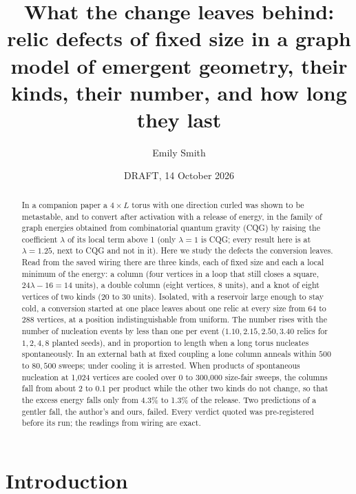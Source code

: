 \documentclass[aps,pre,10pt,twocolumn,superscriptaddress,nofootinbib]{revtex4-2}
\begin{document}
\title{What the change leaves behind: relic defects of fixed size in a graph model of emergent geometry, their
kinds, their number, and how long they last}

\author{Emily Smith}

\date{DRAFT, 14 October 2026}

\begin{abstract}
In a companion paper a $4 \times L$ torus with one direction curled was shown to be metastable, and to convert
after activation with a release of energy, in the family of graph energies obtained from combinatorial quantum
gravity (CQG) by raising the coefficient $\lambda$ of its local term above 1 (only $\lambda = 1$ is CQG; every
result here is at $\lambda = 1.25$, next to CQG and not in it). Here we study the defects the conversion leaves.
Read from the saved wiring there are three kinds, each of fixed size and each a local minimum of the energy: a
column (four vertices in a loop that still closes a square, $24\lambda - 16 = 14$ units), a double column (eight
vertices, 8 units), and a knot of eight vertices of two kinds (20 to 30 units). Isolated, with a reservoir large
enough to stay cold, a conversion started at one place leaves about one relic at every size from 64 to 288
vertices, at a position indistinguishable from uniform. The number rises with the number of nucleation events
by less than one per event ($1.10, 2.15, 2.50, 3.40$ relics for $1, 2, 4, 8$ planted seeds), and in proportion
to length when a long torus nucleates spontaneously. In an external bath at fixed coupling a lone column anneals
within $500$ to $80{,}500$ sweeps; under cooling it is arrested. When products of spontaneous nucleation at
1,024 vertices are cooled over 0 to 300,000 size-fair sweeps, the columns fall from about 2 to 0.1 per product while
the other two kinds do not change, so that the excess energy falls only from 4.3\% to 1.3\% of the release. Two
predictions of a gentler fall, the author's and ours, failed. Every verdict quoted was pre-registered before
its run; the readings from wiring are exact.
\end{abstract}

\maketitle

\section{Introduction}
\end{document}
